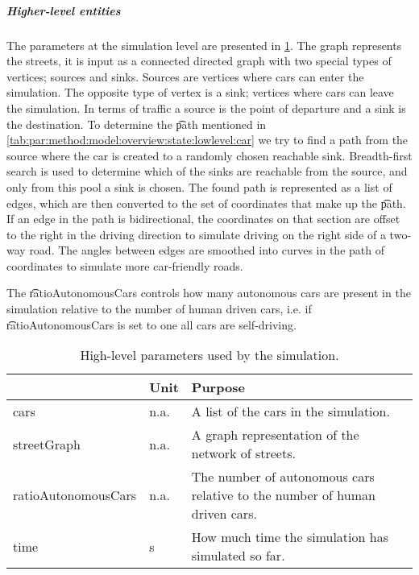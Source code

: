 \subparagraph{Higher-level entities}
The parameters at the simulation level are presented in \cref{tab:par:method:model:overview:state:highlevel:sim}.
The graph represents the streets, it is input as a connected directed graph with two special types of vertices; sources and sinks. Sources are vertices where cars can enter the simulation. The opposite type of vertex is a sink; vertices where cars can leave the simulation. In terms of traffic a source is the point of departure and a sink is the destination. To determine the \t{path} mentioned in \cref{tab:par:method:model:overview:state:lowlevel:car} we try to find a path from the source where the car is created to a randomly chosen reachable sink. Breadth-first search is used to determine which of the sinks are reachable from the source, and only from this pool a sink is chosen. The found path is represented as a list of edges, which are then converted to the set of coordinates that make up the \t{path}. If an edge in the path is bidirectional, the coordinates on that section are offset to the right in the driving direction to simulate driving on the right side of a two-way road. The angles between edges are smoothed into curves in the path of coordinates to simulate more car-friendly roads.

The \t{ratioAutonomousCars} controls how many autonomous cars are present in the simulation relative to the number of human driven cars, i.e. if \t{ratioAutonomousCars} is set to one all cars are self-driving.

\begin{table}
	\centering
	\begin{tabularx}{\textwidth}{>{\ttfamily}llX}
		\toprule
		\normalfont{Parameter}	&Unit & Purpose \\ 
		\midrule
		cars 					
			& n.a.
			& A list of the cars in the simulation. \\ 
		streetGraph		 		
			& n.a.
			& A graph representation of the network of streets. \\ 
		ratioAutonomousCars		 		
			& n.a.
			& The number of autonomous cars relative to the number of human driven cars.\\
		time 
			& \si{\second}
			& How much time the simulation has simulated so far.\\
		\bottomrule
	\end{tabularx}
	\caption{High-level parameters used by the simulation.}
	\label{tab:par:method:model:overview:state:highlevel:sim}
\end{table}

